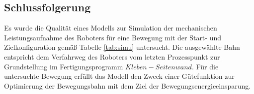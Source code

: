 \subsection{Schlussfolgerung}
Es wurde die Qualität eines Modells zur Simulation der mechanischen Leistungsaufnahme des Roboters für eine Bewegung mit der Start- und Zielkonfiguration gemäß Tabelle \ref{tab:simu} untersucht. Die ausgewählte Bahn entspricht dem Verfahrweg des Roboters vom letzten Prozesspunkt zur Grundstellung im Fertigungsprogramm $Kleben-Seitenwand$. Für die untersuchte Bewegung erfüllt das Modell den Zweck einer Gütefunktion zur Optimierung der Bewegungsbahn mit dem Ziel der Bewegungsenergieeinsparung. 
%
